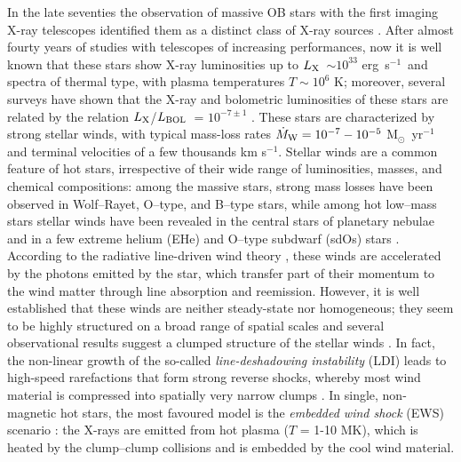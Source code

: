 \documentclass[USenglish,twocolumn]{article}
\def\lum {\mbox{erg s$^{-1}$}}
\def\lx {$L_{\rm X}$}
\def\lbol {$L_{\rm BOL}$}
\def\msole{M$_{\odot}$}
\begin{document}
In the late seventies the observation of massive OB stars with the first imaging X-ray telescopes identified them as a distinct class of X-ray sources \citep{Seward+79,Harnden+79}. After almost fourty years of studies with telescopes of increasing performances, now it is well known that these stars show X-ray luminosities up to \lx\ $\sim 10^{33}$ \lum\ and spectra of thermal type, with plasma temperatures $T \sim 10^6$ K; moreover, several surveys have shown that the X-ray and bolometric luminosities of these stars are related by the relation \lx/\lbol\ = $10^{-7 \pm 1}$ \citep{Naze09}. These stars are characterized by strong stellar winds, with typical mass-loss rates $\dot M_{\rm W} = 10^{-7} - 10^{-5}$ \msole\ yr$^{-1}$ and terminal velocities of a few thousands km s$^{-1}$. Stellar winds are a common feature of hot stars, irrespective of their wide range of luminosities, masses, and chemical compositions: among the massive stars, strong mass losses have been observed in Wolf--Rayet, O--type, and B--type stars, while among hot low--mass stars stellar winds have been revealed in the central stars of planetary nebulae and in a few extreme helium (EHe) and O--type subdwarf (sdOs) stars \citep{Hamann10}. According to the radiative line-driven wind theory \citep{Castor+75,KudritzkiPuls00}, these winds are accelerated by the photons emitted by the star, which transfer part of their momentum to the wind matter through line absorption and reemission. However, it is well established that these winds are neither steady-state nor homogeneous; they seem to be highly structured on a broad range of spatial scales and several observational results suggest a clumped structure of the stellar winds \citep{Sundqvist+12}. In fact, the non-linear growth of the so-called \textit{line-deshadowing instability} (LDI) leads to high-speed rarefactions that form strong reverse shocks, whereby most wind material is compressed into spatially very narrow clumps \citep{SundqvistOwocki12}. In single, non-magnetic hot stars, the most favoured model is the \textit{embedded wind shock} (EWS) scenario \citep{Owocki13,Owocki+13,Cohen+14}: the X-rays are emitted from hot plasma ($T$ = 1-10 MK), which is heated by the clump–clump collisions and is embedded by the cool wind material.
\end{document}
